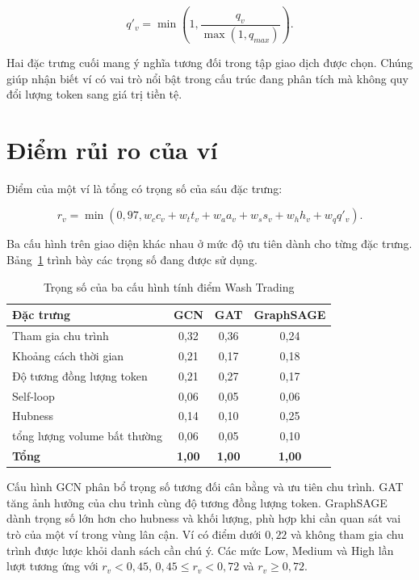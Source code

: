 \begin{equation}
q'_v=\min\left(1,\frac{q_v}{\max(1,q_{max})}\right).
\end{equation}

Hai đặc trưng cuối mang ý nghĩa tương đối trong tập giao dịch được chọn. Chúng giúp nhận biết ví có vai trò nổi bật trong cấu trúc đang phân tích mà không quy đổi lượng token sang giá trị tiền tệ.

\section{Điểm rủi ro của ví}

Điểm của một ví là tổng có trọng số của sáu đặc trưng:

\begin{equation}
r_v=\min\left(0{,}97,
w_c c_v+w_t t_v+w_a a_v+w_s s_v+w_h h_v+w_q q'_v\right).
\end{equation}

Ba cấu hình trên giao diện khác nhau ở mức độ ưu tiên dành cho từng đặc trưng. Bảng~\ref{tab:wash-trading-weights} trình bày các trọng số đang được sử dụng.

\begin{table}[H]
    \centering
    \caption{Trọng số của ba cấu hình tính điểm Wash Trading}
    \label{tab:wash-trading-weights}
    \begin{tabular}{lccc}
        \hline
        \textbf{Đặc trưng} & \textbf{GCN} & \textbf{GAT} & \textbf{GraphSAGE} \\
        \hline
        Tham gia chu trình & 0,32 & 0,36 & 0,24 \\
        Khoảng cách thời gian & 0,21 & 0,17 & 0,18 \\
        Độ tương đồng lượng token & 0,21 & 0,27 & 0,17 \\
        Self-loop & 0,06 & 0,05 & 0,06 \\
        Hubness & 0,14 & 0,10 & 0,25 \\
        tổng lượng volume bất thường & 0,06 & 0,05 & 0,10 \\
        \hline
        \textbf{Tổng} & \textbf{1,00} & \textbf{1,00} & \textbf{1,00} \\
        \hline
    \end{tabular}
\end{table}

Cấu hình GCN phân bổ trọng số tương đối cân bằng và ưu tiên chu trình. GAT tăng ảnh hưởng của chu trình cùng độ tương đồng lượng token. GraphSAGE dành trọng số lớn hơn cho hubness và khối lượng, phù hợp khi cần quan sát vai trò của một ví trong vùng lân cận. Ví có điểm dưới $0{,}22$ và không tham gia chu trình được lược khỏi danh sách cần chú ý. Các mức Low, Medium và High lần lượt tương ứng với $r_v<0{,}45$, $0{,}45\leq r_v<0{,}72$ và $r_v\geq0{,}72$.

